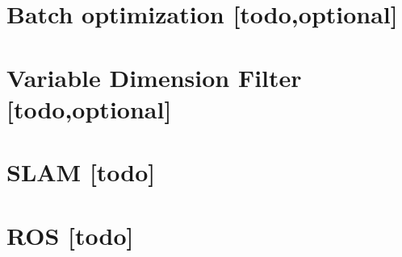 \section{Batch optimization [todo,optional]}


\begin{comment}
------------------------------------------------------------------------------------------
- \cite{kurth2003experimental}
	- Additionally, we will extend the batch method to produce a variable dimension lter, as used by Deans for the case of bearing-only sensors [3], which would consider some window of previous robot states and optimize the position estimates based on the data in that window.
\end{comment}
\section{Variable Dimension Filter [todo,optional]}


\begin{comment}
------------------------------------------------------------------------------------------
Embodied Localisation and Mapping
http://elib.suub.uni-bremen.de/edocs/00103537-1.pdf

- \cite{sarkka2013bayesian}
	- Bayesian filtering and smoothing
- \cite{kurth2003experimental}
	- The Kalman lter approach described in Section 5 can be reformulated for the SLAM problem. To perform SLAM, we include position estimates for each tag in the state, producing a state vector of the form: q(k) = [xk; yk; k; xb1; yb1 ; :::; xbn; ybn]T , where n is the number of beacons.
\end{comment}
\section{SLAM [todo]}



\begin{comment}
------------------------------------------------------------------------------------------
\end{comment}
\section{ROS [todo]}